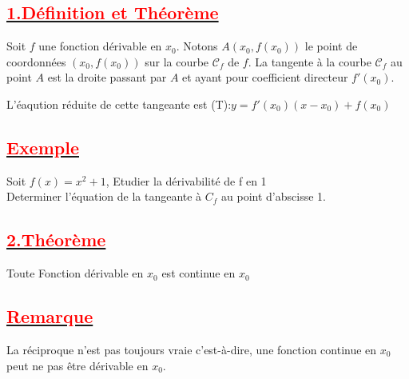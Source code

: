 \documentclass[12pt]{article}
\begin{document}
\subsection*{\underline{\textbf{\textcolor{red}{1.Définition et Théorème}}}}
Soit $f$ une fonction dérivable en $x_0$. Notons $A(x_0, f(x_0))$ le point de coordonnées $(x_0, f(x_0))$ sur la courbe $\mathcal{C}_f$ de $f$. La tangente à la courbe $\mathcal{C}_f$ au point $A$ est la droite passant par $A$ et ayant pour coefficient directeur $f'(x_0)$.\\
L'éaqution réduite de cette tangeante est (T):$y=f'(x_{0})(x-x_{0})+f(x_{0})$
\subsection*{\underline{\textbf{\textcolor{red}{Exemple}}}}
Soit $f(x)=x^{2}+1$, Etudier la dérivabilité de f en 1\\
Determiner l'équation de la tangeante à $C_{f}$ au point d'abscisse 1.\\
\subsection*{\underline{\textbf{\textcolor{red}{2.Théorème}}}}
Toute Fonction dérivable en $x_{0}$ est continue en $x_{0}$
\subsection*{\underline{\textbf{\textcolor{red}{Remarque}}}}
La réciproque n'est pas toujours vraie c'est-à-dire, une fonction continue en $x_{0}$ peut ne pas être dérivable en $x_{0}$.
\end{document}
